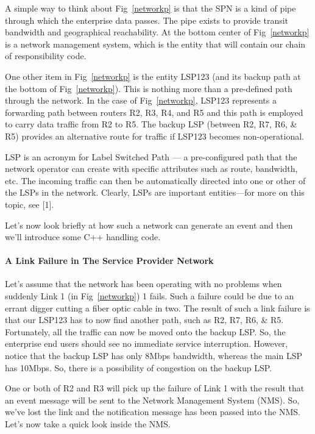 \documentclass{book}
\begin{document}
A simple way to think about Fig~\ref{networkp} is that the SPN is a kind of pipe through which the enterprise data passes.
The pipe exists to provide transit bandwidth and geographical reachability.
At the bottom center of Fig~\ref{networkp} is a network management system, which is the entity that will contain our chain of responsibility code.

One other item in Fig~\ref{networkp} is the entity LSP123 (and its backup path at the bottom of Fig~\ref{networkp}). This is nothing more than a pre-defined path through the network.
In the case of Fig~\ref{networkp}, LSP123 represents a forwarding path between routers R2, R3, R4, and R5 and this path is employed to carry data traffic from R2 to R5.
The backup LSP (between R2, R7, R6, \& R5) provides an alternative route for traffic if LSP123 becomes non-operational.

LSP is an acronym for Label Switched Path — a pre-configured path that the network operator can create with specific attributes such as route, bandwidth, etc.
The incoming traffic can then be automatically directed into one or other of the LSPs in the network. Clearly, LSPs are important entities—for more on this topic, see [1].

Let's now look briefly at how such a network can generate an event and then we'll introduce some C++ handling code. 

\paragraph{A Link Failure in The Service Provider Network}

Let's assume that the network has been operating with no problems when suddenly Link 1 (in Fig~\ref{networkp}) 1 fails.
Such a failure could be due to an errant digger cutting a fiber optic cable in two. 
The result of such a link failure is that our LSP123 has to now find another path, such as R2, R7, R6, \& R5.
Fortunately, all the traffic can now be moved onto the backup LSP. So, the enterprise end users should see no immediate service interruption.
However, notice that the backup LSP has only 8Mbps bandwidth, whereas the main LSP has 10Mbps. So, there is a possibility of congestion on the backup LSP.

One or both of R2 and R3 will pick up the failure of Link 1 with the result that an event message will be sent to the Network Management System (NMS).
So, we've lost the link and the notification message has been passed into the NMS. Let's now take a quick look inside the NMS.
\end{document}
